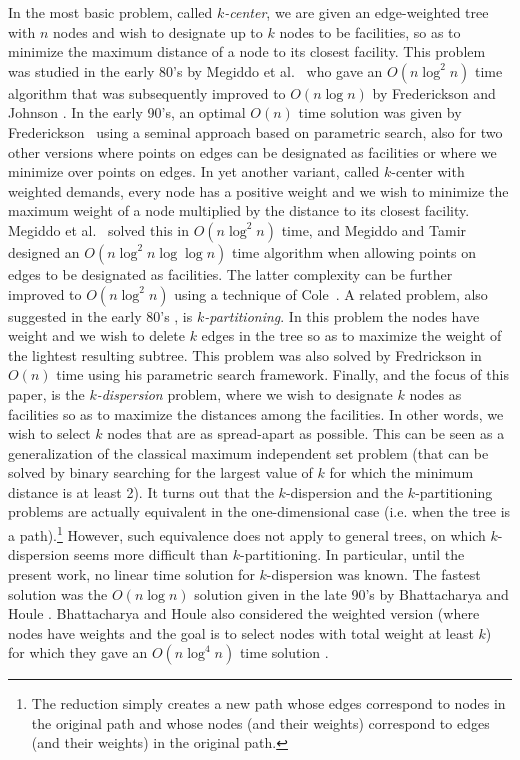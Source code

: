 \documentclass[a4paper,UKenglish]{lipics-v2016}
\theoremstyle{plain}
\newcommand{\Oh}{{O}}
\begin{document}
In the most basic problem, called \emph{$k$-center}, we are given an edge-weighted tree with $n$ nodes and wish to designate up to $k$ nodes to be facilities, so as to minimize the maximum distance of a node to its closest facility. This problem was studied in the early 80's by Megiddo et al.~\cite{Megiddo1981} who gave an $\Oh(n\log^2n)$ time algorithm that was subsequently improved to $\Oh(n\log n)$ by Frederickson and Johnson \cite{Frederickson1983}.
In the early 90's, an optimal $\Oh(n)$ time solution was given by Frederickson~\cite{Frederickson1991a,Frederickson1990} using a seminal approach based on
parametric search, also for two other versions where points on edges can be designated as facilities or where we minimize over points on edges.
In yet another variant, called $k$-center with weighted demands, every node has a positive weight and we wish to minimize the maximum weight of a node multiplied
by the distance to its closest facility. Megiddo et al.~\cite{Megiddo1981} solved this in $\Oh(n\log^{2}n)$ time, and
Megiddo and Tamir~\cite{Megiddo1983} designed an $\Oh(n\log^{2}n\log\log n)$ time algorithm when allowing points on edges to be
designated as facilities. The latter complexity can be further improved to $\Oh(n\log^{2}n)$ using a technique of Cole~\cite{Cole87}. 
%
A related problem, also suggested in the early 80's  \cite{Becker1982,Perl1981}, is \emph{$k$-partitioning}. In this problem the nodes have weight and we wish to delete $k$ edges in the tree so as to maximize the weight of the lightest resulting subtree. This problem was also solved by Fredrickson in $\Oh(n)$ time \cite{Frederickson1991} using his parametric search framework. 
%
Finally, and the focus of this paper, is the  {\em $k$-dispersion} problem, where we wish to designate $k$ nodes as facilities so as to maximize the distances among the facilities.  In other words, we wish to select $k$ nodes that are as spread-apart as possible. This can be seen as a generalization of the classical maximum independent set problem (that can be solved by binary searching for the largest value of $k$ for which the minimum distance is at least 2).  
%
It turns out that the $k$-dispersion and the $k$-partitioning problems are actually equivalent in the one-dimensional case (i.e. when the tree is a path).\footnote{The reduction simply creates a new path whose edges correspond to nodes in the original path and whose nodes (and their weights) correspond to edges (and their weights) in the original path.} However, such equivalence does not apply to general trees, on which $k$-dispersion seems more difficult than $k$-partitioning. In particular, until the present work, no linear time solution for $k$-dispersion was known. The fastest solution was the $O(n \log n)$ solution given in the late 90's by Bhattacharya and Houle \cite{Bhattacharya1991}. Bhattacharya and Houle also considered the weighted version (where nodes have weights and the goal is to select nodes with total weight at least $k$)  for which they gave an $\Oh(n\log^4 n)$ time solution \cite{Bhattacharya1999}.
\end{document}
